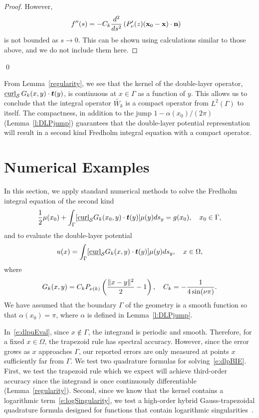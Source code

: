 \begin{proof}
However,
\begin{align*} 
  f''(s) &= -C_k \frac{d^2}{ds^2}\left( P'_\nu(z) 
  (\mathbf{x}_{0}-\mathbf{x}) \cdot \mathbf{n} \right)
\end{align*}
is not bounded as $s\rightarrow 0$. This can be shown using calculations
similar to those above, and we do not include them here.
\end{proof}
\qed

From Lemma~\ref{regularity}, we see that the kernel of the double-layer
operator, $\underline{\mbox{curl}}_{\S}\, G_{k}(x,y)\cdot\vec{t}(y)$, is
continuous at $x \in \Gamma$ as a function of $y$.  This allows us to
conclude that the integral operator $\widetilde{W_k}$ is a compact
operator from $L^{2}(\Gamma)$ to itself.  The compactness, in addition
to the jump $1-\alpha(x_0)/(2\pi)$ (Lemma~\ref{l:DLPjump}) guarantees
that the double-layer potential representation will result in a second
kind Fredholm integral equation with a compact operator.

\section{Numerical Examples}
\label{s:numerics}
In this section, we apply standard numerical methods to solve the
Fredholm integral equation of the second kind
\begin{align}
  \label{e:dlpBIE}
  \frac{1}{2}\mu(x_{0}) + \int_{\Gamma}
    [\underline{\mbox{curl}}_{\S}G_{k}(x_{0},y) \cdot
    \vec{t}(y)] \mu(y)ds_{y} = g(x_{0}), \quad x_{0} \in \Gamma,
\end{align}
and to evaluate the double-layer potential
\begin{align}
  \label{e:dlpuEval}
  u(x) = \int_{\Gamma} [\underline{\mbox{curl}}_{\S}G_{k}(x,y) 
    \cdot \vec{t}(y)] \mu(y)ds_{y}, \quad x \in \Omega,
\end{align}
where
\begin{align*}
  G_{k}(x,y) = C_k P_{\nu(k)} \left(
    \frac{\|x - y\|^{2}}{2} - 1\right), \quad 
  C_k=-\frac{1}{4\sin(\nu\pi)}.
\end{align*}
We have assumed that the boundary $\Gamma$ of the geometry is a smooth
function so that $\alpha(x_{0}) = \pi$, where $\alpha$ is defined in
Lemma~\ref{l:DLPjump}.

In~\eqref{e:dlpuEval}, since $x \notin \Gamma$, the integrand is
periodic and smooth.  Therefore, for a fixed $x\in \Omega$, the
trapezoid rule has spectral accuracy.  However, since the error grows
as $x$ approaches $\Gamma$, our reported errors are only measured at
points $x$ sufficiently far from $\Gamma$.  We test two quadrature
formulas for solving~\eqref{e:dlpBIE}.  First, we test the trapezoid
rule which we expect will achieve third-order accuracy since the
integrand is once continuously differentiable
(Lemma~\ref{regularity}).  Second, since we know that the kernel
contains a logarithmic term~\eqref{e:logSingularity}, we test a
high-order hybrid Gauss-trapezoidal quadrature formula designed for
functions that contain logarithmic singularities~\cite{alpert}.

